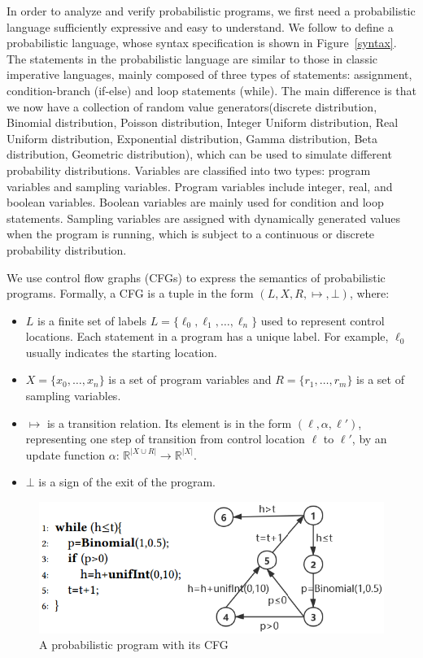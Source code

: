 \documentclass[sigconf,review, anonymous]{acmart}
\begin{document}
In order to analyze and verify probabilistic programs, we first need a probabilistic language sufficiently expressive and easy to understand. We follow \cite{Sankaranarayanan2013Static} to define a probabilistic language, whose syntax specification is shown in Figure~\ref{syntax}. The statements in the probabilistic language are similar to those in classic imperative languages, mainly composed of three types of statements: assignment, condition-branch (if-else) and loop statements (while). The main difference is that we now have a collection of random value generators(discrete distribution, Binomial distribution, Poisson distribution, Integer Uniform distribution, Real Uniform distribution, Exponential distribution, Gamma distribution, Beta distribution, Geometric distribution), which can be used to simulate different probability distributions. Variables are classified into two types: program variables and sampling variables. Program variables include integer, real, and boolean variables. Boolean variables are mainly used for condition and loop statements. Sampling variables are assigned with dynamically generated values when the program is running, which is subject to a continuous or discrete probability distribution.


We use control flow graphs (CFGs) to express the semantics of probabilistic programs. Formally, a CFG is a tuple in the form $(L,X,R,\mapsto,\bot)$, where:

\begin{itemize}
	\item $L$ is a finite set of labels $L=\{\ell_0,\ell_1,\dots,\ell_n\}$ used to represent control locations. Each statement in a program has a unique label. For example, $\ell_0$ usually indicates the starting location.
	
	\item $X=\{x_0,\dots,x_n\}$ is a set of program variables and $R=\{r_1,\dots,r_m\}$ is a set of sampling variables.
	
	\item $\mapsto$ is a transition relation. Its element is in the form $(\ell,\alpha,\ell')$, representing one step of transition from control location $\ell$ to $\ell'$, by an update function $\alpha$: $\mathbb{R}^{|X\cup R|}\to \mathbb{R}^{|X|}$.
	
	\item $\bot$ is a sign of the exit of the program.
\end{itemize}


\begin{figure}[h]
	\centering
	\includegraphics[scale=0.7]{img/example}
	\caption{A probabilistic program with its CFG}
	\label{example1}
\end{figure}
\end{document}
